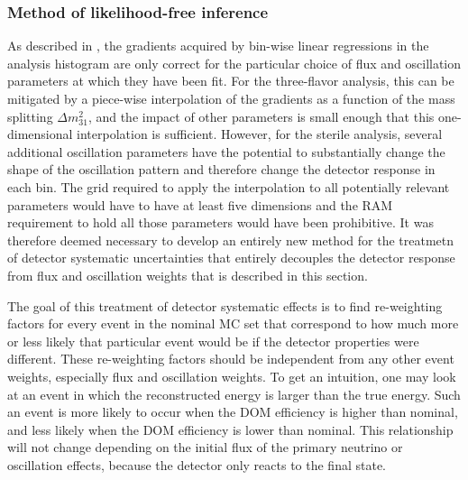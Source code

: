 \subsubsection{Method of likelihood-free inference}
\label{sec:ultrasurfaces}
 As described in , the gradients acquired by bin-wise linear regressions in the analysis histogram are only correct for the particular choice of flux and oscillation parameters at which they have been fit. For the three-flavor analysis, this can be mitigated by a piece-wise interpolation of the gradients as a function of the mass splitting $\Delta m^2_{31}$, and the impact of other parameters is small enough that this one-dimensional interpolation is sufficient. However, for the sterile analysis, several additional oscillation parameters have the potential to substantially change the shape of the oscillation pattern and therefore change the detector response in each bin. The grid required to apply the interpolation to all potentially relevant parameters would have to have at least five dimensions and the RAM requirement to hold all those parameters would have been prohibitive. It was therefore deemed necessary to develop an entirely new method for the treatmetn of detector systematic uncertainties that entirely decouples the detector response from flux and oscillation weights that is described in this section.

The goal of this treatment of detector systematic effects is to find re-weighting factors for every event in the nominal MC set that correspond to how much more or less likely that particular event would be if the detector properties were different. These re-weighting factors should be independent from any other event weights, especially flux and oscillation weights. To get an intuition, one may look at an event in which the reconstructed energy is larger than the true energy. Such an event is more likely to occur when the DOM efficiency is higher than nominal, and less likely when the DOM efficiency is lower than nominal. This relationship will not change depending on the initial flux of the primary neutrino or oscillation effects, because the detector only reacts to the final state.

